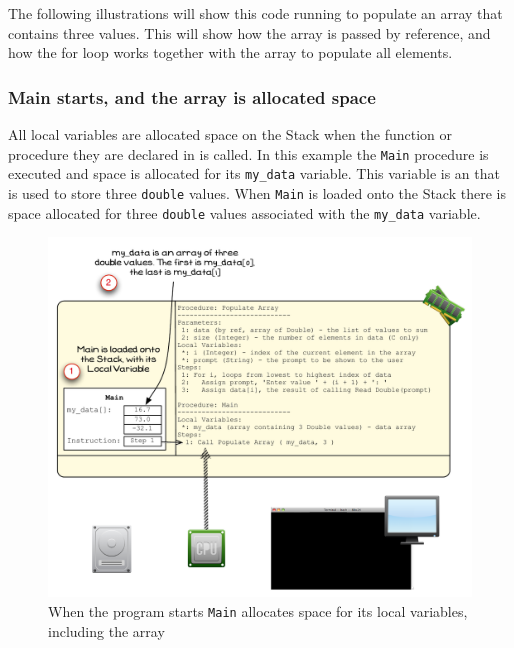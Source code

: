 The following illustrations will show this code running to populate an array that contains three values. This will show how the array is passed by reference, and how the for loop works together with the array to populate all elements.

\clearpage
\subsubsection{Main starts, and the array is allocated space} %
\label{ssub:main_starts_and_the_array_is_allocated_space}

All local variables are allocated space on the Stack when the function or procedure they are declared in is called. In this example the \texttt{Main} procedure is executed and space is allocated for its \texttt{my\_data} variable. This variable is an  that is used to store three \texttt{double} values. When \texttt{Main} is loaded onto the Stack there is space allocated for three \texttt{double} values associated with the \texttt{my\_data} variable.

\begin{figure}[htbp]
   \centering
   \includegraphics[width=\textwidth]{./topics/arrays/images/PopulateArray1} 
   \caption{When the program starts \texttt{Main} allocates space for its local variables, including the array}
   \label{fig:populate-array-vis-1}
\end{figure}

